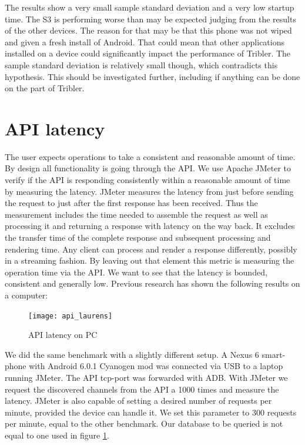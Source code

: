 The results show a very small sample standard deviation and a very low startup time.
The S3 is performing worse than may be expected judging from the results of the other devices.
The reason for that may be that this phone was not wiped and given a fresh install of Android.
That could mean that other applications installed on a device could significantly impact the performance of Tribler.
The sample standard deviation is relatively small though, which contradicts this hypothesis.
This should be investigated further, including if anything can be done on the part of Tribler.


\section{API latency}
The user expects operations to take a consistent and reasonable amount of time.
By design all functionality is going through the API.
We use Apache JMeter to verify if the API is responding consistently within a reasonable amount of time by measuring the latency.
JMeter measures the latency from just before sending the request to just after the first response has been received. \cite{jmeter_glossary}
Thus the measurement includes the time needed to assemble the request as well as processing it and returning a response with latency on the way back.
It excludes the transfer time of the complete response and subsequent processing and rendering time.
Any client can process and render a response differently, possibly in a streaming fashion.
By leaving out that element this metric is measuring the operation time via the API.
We want to see that the latency is bounded, consistent and generally low.
Previous research has shown the following results on a computer:
\begin{figure}[h]
	\centering %
	\texttt{[image: api\_laurens]}
	\caption{API latency on PC}
	\label{fig:api_laurens}
\end{figure}
We did the same benchmark with a slightly different setup.
A Nexus 6 smart-phone with Android 6.0.1 Cyanogen mod was connected via USB to a laptop running JMeter.
The API tcp-port was forwarded with ADB.
With JMeter we request the discovered channels from the API a 1000 times and measure the latency.
JMeter is also capable of setting a desired number of requests per minute, provided the device can handle it.
We set this parameter to 300 requests per minute, equal to the other benchmark.
Our database to be queried is not equal to one used in figure \ref{fig:api_laurens}.
